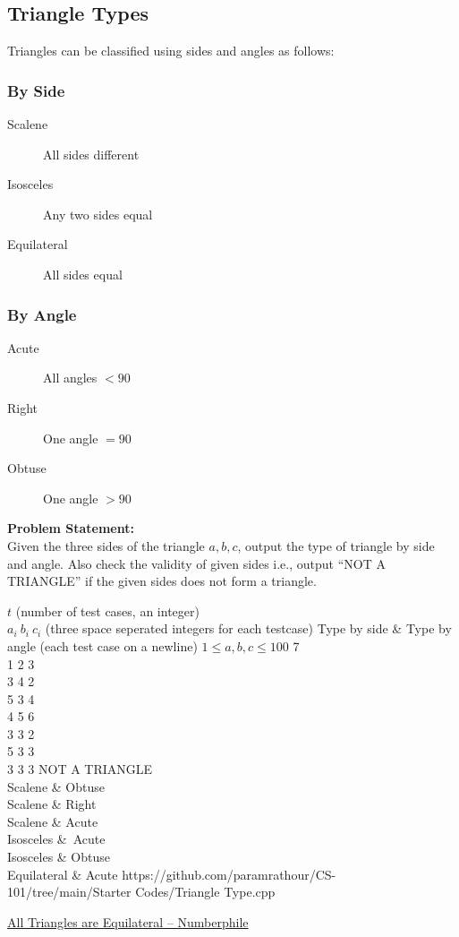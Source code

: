 \documentclass[../../Problems]{subfiles}
\begin{document}
\subsection{Triangle Types}{\label{pp:triangletypes}}
Triangles can be classified using sides and angles as follows:
\vspace{-0.5em}
\subsubsection{By Side}
\begin{description}
\item[Scalene] All sides different
\item[Isosceles] Any two sides equal
\item[Equilateral] All sides equal
\end{description}
\vspace{-0.5em}
\subsubsection{By Angle}
\begin{description}
\item[Acute] All angles $< 90$\textdegree
\item[Right] One angle $= 90$\textdegree
\item[Obtuse] One angle $> 90$\textdegree
\end{description}
\textbf{Problem Statement:}\\
Given the three sides of the triangle $a,b,c$, output the type of triangle by side and angle. Also check the validity of given sides i.e., output ``NOT A TRIANGLE'' if the given sides does not form a triangle.
\begin{testcases}
	{$t$ \hfill(number of test cases, an integer)\\
	$a_{i}\ b_{i}\ c_{i}$ \hfill(three space seperated integers for each testcase)}
	{Type by side \& Type by angle \hfill{(each test case on a newline)}}
	{$1 \leq a,b,c \leq 100$}
	{7\\1 2 3\\3 4 2\\5 3 4\\4 5 6\\3 3 2\\5 3 3\\3 3 3}
	{NOT A TRIANGLE\\Scalene \& Obtuse\\Scalene \& Right\\Scalene \& Acute\\Isosceles \&\ Acute\\Isosceles \& Obtuse\\Equilateral \& Acute}
	{https://github.com/paramrathour/CS-101/tree/main/Starter Codes/Triangle Type.cpp}
\end{testcases}
\begin{funvideo}
\href{https://youtu.be/Yajonhixy4g}{All Triangles are Equilateral -- Numberphile}
\end{funvideo}
\end{document}
